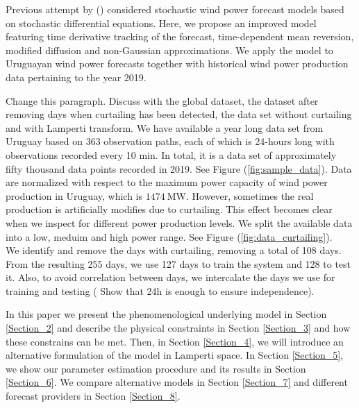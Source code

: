 \documentclass[11pt]{article}
\theoremstyle{definition}
\begin{document}
Previous attempt by (\cite{mozuma}) considered stochastic wind power forecast models based on stochastic differential equations. Here, we propose an improved model featuring time derivative tracking of the forecast, time-dependent mean reversion, modified diffusion and non-Gaussian approximations. We apply the model to Uruguayan wind power forecasts together with historical wind power production data pertaining to the year 2019.

{\color{red} Change this paragraph. Discuss with the global dataset, the dataset after removing days when curtailing has been detected, the data set without curtailing and with Lamperti transform.}
We have available a year long data set from Uruguay based on 363 observation paths, each of which is 24-hours long with observations recorded every 10 min. In total, it is a data set of approximately fifty thousand data points recorded in 2019. See Figure (\ref{fig:sample_data}). Data are normalized with respect to the maximum power capacity of wind power production in Uruguay, which is $\SI{1474}{\mega\watt}$. However, sometimes the real production is artificially modifies due to curtailing. This effect becomes clear when we inspect for different power production levels. We split the available data into a low, meduim and high power range. See Figure (\ref{fig:data_curtailing}).\\
We identify and remove the days with curtailing, removing a total of 108 days. From the resulting 255 days, we use 127 days to train the system and 128 to test it. Also, to avoid correlation between days, we intercalate the days we use for training and testing ({\color{red} Show that 24h is enough to ensure independence}).

In this paper we present the phenomenological underlying model in Section \ref{Section_2} and describe the physical constraints in Section \ref{Section_3} and how these constrains can be met. Then, in Section \ref{Section_4}, we will introduce an alternative formulation of the model in Lamperti space. In Section \ref{Section_5}, we show our parameter estimation procedure and its results in Section \ref{Section_6}. We compare alternative models in Section \ref{Section_7} and different forecast providers in Section \ref{Section_8}.
\end{document}
